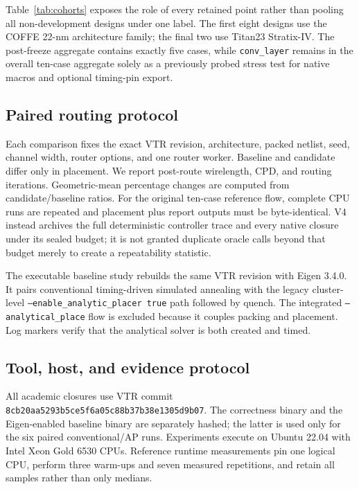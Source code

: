 \documentclass[sigconf,anonymous,review]{acmart}
\begin{document}
Table~\ref{tab:cohorts} exposes the role of every retained point rather than
pooling all non-development designs under one label.  The first eight designs
use the COFFE 22-nm architecture family; the final two use Titan23 Stratix-IV.
The post-freeze aggregate contains exactly five cases, while
\texttt{conv\_layer} remains in the overall ten-case aggregate solely as a
previously probed stress test for native macros and optional timing-pin export.

\subsection{Paired routing protocol}

Each comparison fixes the exact VTR revision, architecture, packed netlist,
seed, channel width, router options, and one router worker.  Baseline and
candidate differ only in placement.  We report post-route wirelength, CPD, and
routing iterations.  Geometric-mean percentage changes are computed from
candidate/baseline ratios.  For the original ten-case reference flow,
complete CPU runs are repeated and placement plus report outputs must be
byte-identical.  V4 instead archives the full deterministic controller trace
and every native closure under its sealed budget; it is not granted duplicate
oracle calls beyond that budget merely to create a repeatability statistic.

The executable baseline study rebuilds the same VTR revision with Eigen 3.4.0.
It pairs conventional timing-driven simulated annealing with the legacy
cluster-level \texttt{--enable\_analytic\_placer true} path followed by
quench.  The integrated \texttt{--analytical\_place} flow is excluded because
it couples packing and placement.  Log markers verify that the analytical
solver is both created and timed.

\subsection{Tool, host, and evidence protocol}

All academic closures use VTR commit
\texttt{8cb20aa5293b5ce5}\allowbreak\texttt{f6a05c88b37b38e1305d9b07}.  The correctness binary and
the Eigen-enabled baseline binary are separately hashed; the latter is used
only for the six paired conventional/AP runs.  Experiments execute on Ubuntu
22.04 with Intel Xeon Gold 6530 CPUs.  Reference runtime measurements pin one
logical CPU, perform three warm-ups and seven measured repetitions, and retain
all samples rather than only medians.
\end{document}
